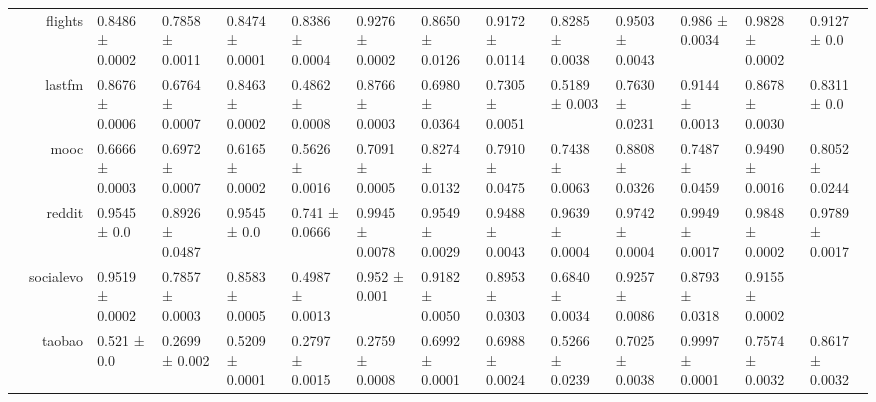 {\begin{tabular}{@{}crllllllllllll@{}}
                                    & flights              & 0.8486 ± 0.0002           & 0.7858 ± 0.0011            & 0.8474 ± 0.0001           & 0.8386 ± 0.0004            & \multicolumn{1}{l|}{0.9276 ± 0.0002} & 0.8650 ± 0.0126           & 0.9172 ± 0.0114           & 0.8285 ± 0.0038          & 0.9503 ± 0.0043         & 0.986 ± 0.0034          & 0.9828 ± 0.0002          & 0.9127 ± 0.0               \\
                                    & lastfm               & 0.8676 ± 0.0006           & 0.6764 ± 0.0007            & 0.8463 ± 0.0002           & 0.4862 ± 0.0008            & \multicolumn{1}{l|}{0.8766 ± 0.0003} & 0.6980 ± 0.0364           & 0.7305 ± 0.0051           & 0.5189 ± 0.003           & 0.7630 ± 0.0231         & 0.9144 ± 0.0013         & 0.8678 ± 0.0030          & 0.8311 ± 0.0               \\
                                    & mooc                 & 0.6666 ± 0.0003           & 0.6972 ± 0.0007            & 0.6165 ± 0.0002           & 0.5626 ± 0.0016            & \multicolumn{1}{l|}{0.7091 ± 0.0005} & 0.8274 ± 0.0132           & 0.7910 ± 0.0475           & 0.7438 ± 0.0063          & 0.8808 ± 0.0326         & 0.7487 ± 0.0459         & 0.9490 ± 0.0016          & 0.8052 ± 0.0244            \\
                                    & reddit               & 0.9545 ± 0.0              & 0.8926 ± 0.0487            & 0.9545 ± 0.0              & 0.741 ± 0.0666             & \multicolumn{1}{l|}{0.9945 ± 0.0078} & 0.9549 ± 0.0029           & 0.9488 ± 0.0043           & 0.9639 ± 0.0004          & 0.9742 ± 0.0004         & 0.9949 ± 0.0017         & 0.9848 ± 0.0002          & 0.9789 ± 0.0017            \\
                                    & socialevo            & 0.9519 ± 0.0002           & 0.7857 ± 0.0003            & 0.8583 ± 0.0005           & 0.4987 ± 0.0013            & \multicolumn{1}{l|}{0.952 ± 0.001}   & 0.9182 ± 0.0050           & 0.8953 ± 0.0303           & 0.6840 ± 0.0034          & 0.9257 ± 0.0086         & 0.8793 ± 0.0318         & 0.9155 ± 0.0002          &                            \\
                                    & taobao               & 0.521 ± 0.0               & 0.2699 ± 0.002             & 0.5209 ± 0.0001           & 0.2797 ± 0.0015            & \multicolumn{1}{l|}{0.2759 ± 0.0008} & 0.6992 ± 0.0001           & 0.6988 ± 0.0024           & 0.5266 ± 0.0239          & 0.7025 ± 0.0038         & 0.9997 ± 0.0001         & 0.7574 ± 0.0032          & 0.8617 ± 0.0032            \\

\end{tabular}}
